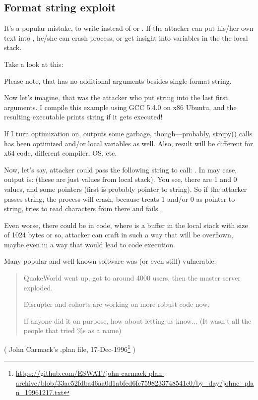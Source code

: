 \subsection{Format string exploit}

It's a popular mistake, to write  instead of  or .
If the attacker can put his/her own text into , he/she can crash process,
or get insight into variables in the the local stack.

Take a look at this:



Please note, that \printf has no additional arguments besides single format string.

Now let's imagine, that was the attacker who put  string into the last \printf first arguments.
I compile this example using GCC 5.4.0 on x86 Ubuntu, and the resulting executable prints  string if it gets executed!

If I turn optimization on, \printf outputs some garbage, though---probably, strcpy() calls has been optimized and/or
local variables as well.
Also, result will be different for x64 code, different compiler, \ac{OS}, etc.

Now, let's say, attacker could pass the following string to \printf call: .
In may case, output is:  (these are just values from local stack).
You see, there are 1 and 0 values, and some pointers (first is probably pointer to  string).
So if the attacker passes  string, the process will crash, because \printf treats 1 and/or 0
as pointer to string, tries to read characters from there and fails.

Even worse, there could be  in code, where  is a buffer in the local stack
with size of 1024 bytes or so, attacker can craft  in such a way that  will be overflown,
maybe even in a way that would lead to code execution.

Many popular and well-known software was (or even still) vulnerable:

\begin{framed}
\begin{quotation}
QuakeWorld went up, got to around 4000 users, then the master server exploded.

Disrupter and cohorts are working on more robust code now.

If anyone did it on purpose, how about letting us know... (It wasn't all the people that tried \%s as a name)
\end{quotation}
\end{framed}
( John Carmack's .plan file, 17-Dec-1996\footnote{\url{https://github.com/ESWAT/john-carmack-plan-archive/blob/33ae52fdba46aa0d1abfed6fc7598233748541c0/by_day/johnc_plan_19961217.txt}} )

